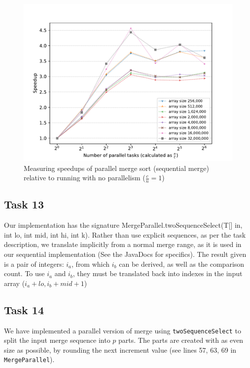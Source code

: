 \documentclass[11pt, a4paper]{article}
\begin{document}
\begin{figure}[h]
  \begin{center}
    \includegraphics[width=\textwidth]{plot/t12p1.pdf}
    \caption{Measuring speedups of parallel merge sort (sequential merge) relative to running with no parallelism ($\frac{c}{n} = 1$)}
    \label{fig:t12p1}
  \end{center}
\end{figure}

\subsection{Task 13}

Our implementation has the signature MergeParallel.twoSequenceSelect(T[] in, int lo, int mid, int hi, int k).
Rather than use explicit sequences, as per the task description, we translate implicitly from a normal merge range, as it is used in our sequential implementation (See the JavaDocs for specifics).
The result given is a pair of integers: $i_a$, from which $i_b$ can be derived, as well as the comparison count. To use $i_a$ and $i_b$, they must be translated back into indexes in the input array ($i_a+lo, i_b+mid+1$)

\subsection{Task 14}

We have implemented a parallel version of merge using \texttt{twoSequenceSelect} to split the input merge sequence into $p$ parts.
The parts are created with as even size as possible, by rounding the next increment value (see lines 57, 63, 69 in \texttt{MergeParallel}).
\end{document}
